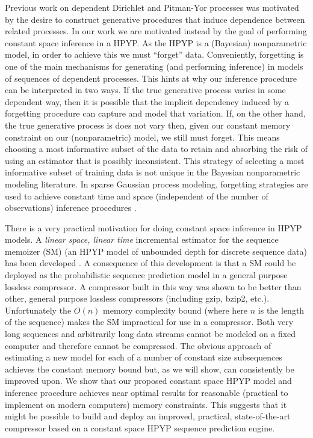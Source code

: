 Previous work on dependent Dirichlet and Pitman-Yor processes \cite{MacEachern2000, Srebro2005, Griffin2006, Caron2007, Caron2007a} was motivated by the desire to construct generative procedures that induce dependence between related processes.  In our work we are motivated instead by the goal of performing constant space inference in a HPYP.  As the HPYP is a (Bayesian) nonparametric model, in order to achieve this we must ``forget'' data.  Conveniently, forgetting is one of the main mechanisms for generating (and performing inference) in models of sequences of dependent processes.  This hints at why our inference procedure can be interpreted in two ways.  If the true generative process varies in some dependent way, then it is possible that the implicit dependency induced by a forgetting procedure can capture and model that variation.  If, on the other hand, the true generative process is does not vary then, given our constant memory constraint on our (nonparametric) model, we still must forget.  This means choosing a  most informative subset of the data to retain and absorbing the risk of using an estimator that is possibly inconsistent.  This strategy of selecting a most informative subset of training data is not unique in the Bayesian nonparametric modeling literature.  In sparse Gaussian process modeling, forgetting strategies are used to achieve constant time and space (independent of the number of observations) inference procedures \cite{ Lawrence2003, Csat'o2002, Snelson2006}.

 
There is a very practical motivation for doing constant space inference in HPYP models.  A  {\em linear space, linear time} incremental estimator for the sequence memoizer (SM) \cite{Wood2009} (an HPYP model of unbounded depth for discrete sequence data) has been developed \cite{Gasthaus2010}.   A consequence of this development is that a SM could be deployed as the probabilistic sequence prediction model in a general purpose lossless compressor.   A compressor built in this way was shown to be better than other, general purpose lossless compressors (including gzip, bzip2, etc.).  Unfortunately the $O(n)$ memory complexity bound (where here $n$ is the length of the sequence) makes the SM impractical for use in a compressor.  Both very long sequences and arbitrarily long data streams cannot be modeled on a fixed computer and therefore cannot be compressed.  The obvious approach of estimating a new model for each of a number of constant size subsequences achieves the constant memory bound but, as we will show, can consistently be improved upon.   We show that our proposed constant space HPYP model and inference procedure achieves near optimal results for reasonable (practical to implement on modern computers) memory constraints.  This suggests that it might be possible to build and deploy an improved, practical, state-of-the-art compressor based on a constant space HPYP sequence prediction engine.

